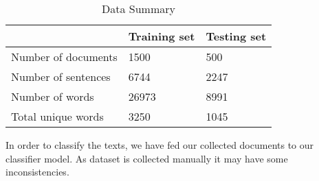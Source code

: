  \renewcommand{\arraystretch}{1.3}
\begin{table}[h!]
\begin{center}
\caption{Data Summary}
\begin{tabular}{||m{4cm} | m{1.7cm}| m{1.7cm}||}
\hline
    & Training set & Testing set \\
\hline
\hline
     Number of documents & 1500 & 500 \\
\hline
    Number of sentences & 6744 & 2247\\
\hline
    Number of words & 26973 & 8991\\
\hline
    Total unique words & 3250 & 1045\\
\hline

\end{tabular}
\label{data}
\end{center}
\end{table}
\noindent
In order to classify the texts, we have fed our collected documents to our classifier model. As dataset is collected manually it may have some inconsistencies.